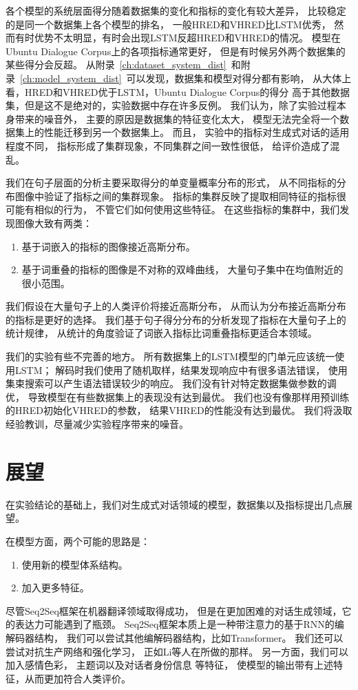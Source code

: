 各个模型的系统层面得分随着数据集的变化和指标的变化有较大差异，
比较稳定的是同一个数据集上各个模型的排名，
一般HRED和VHRED比LSTM优秀，
然而有时优势不太明显，有时会出现LSTM反超HRED和VHRED的情况。
模型在Ubuntu Dialogue Corpus上的各项指标通常更好，
但是有时候另外两个数据集的某些得分会反超。
从附录~\ref{ch:dataset_system_dist}~和附录~\ref{ch:model_system_dist}~可以发现，数据集和模型对得分都有影响，
从大体上看，HRED和VHRED优于LSTM，Ubuntu Dialogue Corpus的得分
高于其他数据集，但是这不是绝对的，实验数据中存在许多反例。
我们认为，除了实验过程本身带来的噪音外，
主要的原因是数据集的特征变化太大，
模型无法完全将一个数据集上的性能迁移到另一个数据集上。
而且，
实验中的指标对生成式对话的适用程度不同，
指标形成了集群现象，不同集群之间一致性很低，
给评价造成了混乱。

我们在句子层面的分析主要采取得分的单变量概率分布的形式，
从不同指标的分布图像中验证了指标之间的集群现象。
指标的集群反映了提取相同特征的指标很可能有相似的行为，
不管它们如何使用这些特征。
在这些指标的集群中，我们发现图像大致有两类：
\begin{enumerate}
    \item 基于词嵌入的指标的图像接近高斯分布。
    \item 基于词重叠的指标的图像是不对称的双峰曲线，
    大量句子集中在均值附近的很小范围。
\end{enumerate}
我们假设在大量句子上的人类评价将接近高斯分布，
从而认为分布接近高斯分布的指标是更好的选择。
我们基于句子得分分布的分析发现了指标在大量句子上的统计规律，
从统计的角度验证了词嵌入指标比词重叠指标更适合本领域。

我们的实验有些不完善的地方。
所有数据集上的LSTM模型的门单元应该统一使用LSTM；
解码时我们使用了随机取样，结果发现响应中有很多语法错误，
使用集束搜索可以产生语法错误较少的响应。
我们没有针对特定数据集做参数的调优，
导致模型在有些数据集上的表现没有达到最优。
我们也没有像\cite{VHRED}那样用预训练的HRED初始化VHRED的参数，
结果VHRED的性能没有达到最优。
我们将汲取经验教训，尽量减少实验程序带来的噪音。

\section{展望}\label{sec:future_work}
在实验结论的基础上，我们对生成式对话领域的模型，数据集以及指标提出几点展望。

在模型方面，两个可能的思路是：
\begin{enumerate}
    \item 使用新的模型体系结构。
    \item 加入更多特征。
\end{enumerate}
尽管Seq2Seq框架在机器翻译领域取得成功，
但是在更加困难的对话生成领域，它的表达力可能遇到了瓶颈。
Seq2Seq框架本质上是一种带注意力的基于RNN的编解码器结构，
我们可以尝试其他编解码器结构，比如Transformer。
我们还可以尝试对抗生产网络和强化学习，
正如Li等人在\cite{deep_RL,Adversarial}所做的那样。
另一方面，我们可以加入感情色彩，
主题词以及对话者身份信息
等特征， 使模型的输出带有上述特征，从而更加符合人类评价。


